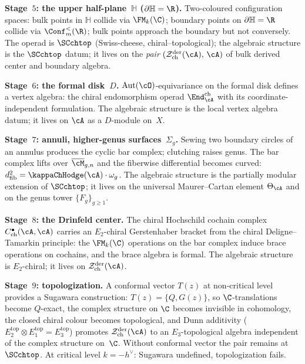 \smallskip
\noindent\textbf{Stage~$5$: the upper half-plane~$\mathbb{H}$
($\partial\mathbb{H} = \R$).}\enspace
Two-coloured configuration spaces: bulk points in $\mathbb{H}$
collide via $\FM_k(\C)$; boundary points on
$\partial\mathbb{H} = \R$ collide via $\Conf_m^{<}(\R)$; bulk
points approach the boundary but not conversely. The operad is
$\SCchtop$ (Swiss-cheese, chiral--topological); the algebraic
structure is the $\SCchtop$ datum; it lives on the \emph{pair}
$(\cZ^{\mathrm{der}}_{\mathrm{ch}}(\cA),\, \cA)$ of bulk
derived center and boundary algebra.

\smallskip
\noindent\textbf{Stage~$6$: the formal disk~$D$.}\enspace
$\operatorname{Aut}(\cO)$-equivariance on the formal disk
defines a vertex algebra: the chiral endomorphism operad
$\End^{\mathrm{ch}}_\cA$ with its coordinate-independent
formulation. The algebraic structure is the local vertex algebra
datum; it lives on $\cA$ as a $D$-module on~$X$.

\smallskip
\noindent\textbf{Stage~$7$: annuli, higher-genus
surfaces~$\Sigma_g$.}\enspace
Sewing two boundary circles of an annulus produces the cyclic bar
complex; clutching raises genus. The bar complex lifts over
$\overline{\cM}_{g,n}$ and the fiberwise differential becomes
curved: $d_{\mathrm{fib}}^2 = \kappaChHodge(\cA) \cdot \omega_g$.
The algebraic structure is the partially modular extension of
$\SCchtop$; it lives on the universal Maurer--Cartan element
$\Theta_\cA$ and on the genus tower $\{F_g\}_{g \ge 1}$.

\smallskip
\noindent\textbf{Stage~$8$: the Drinfeld center.}\enspace
The chiral Hochschild cochain complex
$C^\bullet_{\mathrm{ch}}(\cA, \cA)$ carries an $E_2$-chiral
Gerstenhaber bracket from the chiral Deligne--Tamarkin principle:
the $\FM_k(\C)$ operations on the bar complex induce brace
operations on cochains, and the brace algebra is formal. The
algebraic structure is $E_2$-chiral; it lives on
$\cZ^{\mathrm{der}}_{\mathrm{ch}}(\cA)$.

\smallskip
\noindent\textbf{Stage~$9$: topologization.}\enspace
A conformal vector $T(z)$ at non-critical level provides a
Sugawara construction: $T(z) = \{Q, G(z)\}$, so
$\C$-translations become $Q$-exact, the complex structure on
$\C$ becomes invisible in cohomology, the closed chiral colour
becomes topological, and Dunn additivity
($E_2^{\mathrm{top}} \otimes E_1^{\mathrm{top}} = E_3^{\mathrm{top}}$)
promotes $\cZ^{\mathrm{der}}_{\mathrm{ch}}(\cA)$ to an
$E_3$-topological algebra independent of the complex structure
on~$\C$. Without conformal vector the pair remains at $\SCchtop$.
At critical level $k = -h^\vee$: Sugawara undefined,
topologization fails.

